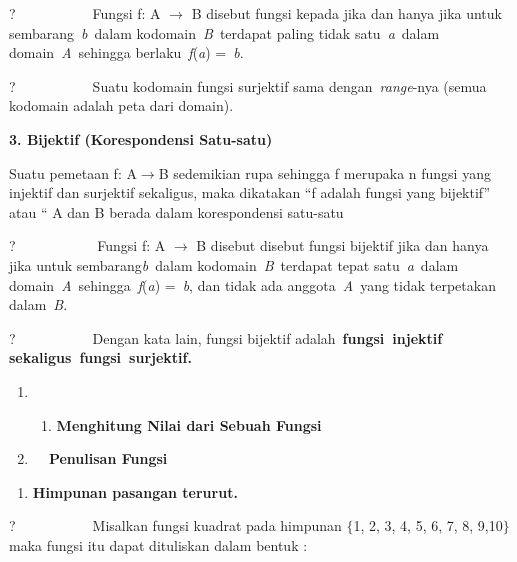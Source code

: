 \documentclass[11pt,fleqn]{book} %
\begin{document}
\noindent ?~~~~~~~~~~~Fungsi f: A $\mathrm{\to}$ B disebut fungsi kepada jika dan hanya jika untuk sembarang~\textit{b}~dalam kodomain~\textit{B}~terdapat paling tidak satu~\textit{a}~dalam domain~\textit{A}~sehingga berlaku~\textit{f}(\textit{a}) =~\textit{b}.

\noindent ?~~~~~~~~~~~Suatu kodomain fungsi surjektif sama dengan~\textit{range}-nya (semua kodomain adalah peta dari domain).

\noindent 

\noindent \textbf{3. Bijektif (Korespondensi Satu-satu)}

\noindent 

\noindent Suatu pemetaan f: A$\mathrm{\to}$B sedemikian rupa sehingga f merupaka n fungsi yang injektif dan surjektif sekaligus, maka dikatakan ``f adalah fungsi yang bijektif'' atau `` A dan B berada dalam korespondensi satu-satu

\noindent 

\noindent ?~~~~~~~~~~~ Fungsi f: A $\mathrm{\to}$ B disebut disebut fungsi bijektif jika dan hanya jika untuk sembarang\textit{b}~dalam kodomain~\textit{B}~terdapat tepat satu~\textit{a}~dalam domain~\textit{A}~sehingga~\textit{f}(\textit{a}) =~\textit{b}, dan tidak ada anggota~\textit{A}~yang tidak terpetakan dalam~\textit{B}.

\noindent ?~~~~~~~~~~~Dengan kata lain, fungsi bijektif adalah~\textbf{fungsi~injektif sekaligus~fungsi~surjektif.}

\noindent \textbf{}

\noindent \textbf{}

\begin{enumerate}
\item \begin{enumerate}
\item \textbf{ Menghitung Nilai dari Sebuah Fungsi}
\end{enumerate}

\item \textbf{ ~~Penulisan Fungsi}
\end{enumerate}

\noindent \textbf{}

\begin{enumerate}
\item \textbf{ Himpunan pasangan terurut.}
\end{enumerate}

\noindent 

\noindent ?~~~~~~~~~~~Misalkan fungsi kuadrat pada himpunan $\{$1, 2, 3, 4, 5, 6, 7, 8, 9,10$\}$ maka fungsi itu dapat dituliskan dalam bentuk :
\end{document}

